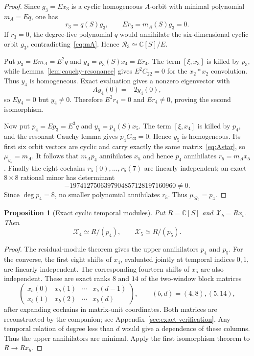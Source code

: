 \documentclass[11pt]{amsart}
\newtheorem{proposition}[theorem]{Proposition}
\newcommand{\C}{\mathbb C}
\begin{document}
\begin{proof}
Since $g_3=Ex_3$ is a cyclic homogeneous $A$-orbit with minimal polynomial $m_A=Eq$, one has
\[
r_3=q(S)g_3,
\qquad
Er_3=m_A(S)g_3=0.
\]
If $r_3=0$, the degree-five polynomial $q$ would annihilate the six-dimensional cyclic orbit $g_3$, contradicting~\eqref{eq:mA}.  Hence $\mathcal R_3\simeq\C[S]/E$.

Put $p_3=Em_A=E^2q$ and $y_4=p_3(S)x_4=Er_4$.  The term $[\xi,x_3]$ is killed by $p_3$, while Lemma~\ref{lem:cauchy-resonance} gives $E^2C_{22}=0$ for the $x_2*x_2$ convolution.  Thus $y_4$ is homogeneous.  Exact evaluation gives a nonzero eigenvector with
\[
Ay_4(0)=-2y_4(0),
\]
so $Ey_4=0$ but $y_4\neq0$.  Therefore $E^2r_4=0$ and $Er_4\neq0$, proving the second isomorphism.

Now put $p_4=Ep_3=E^3q$ and $y_5=p_4(S)x_5$.  The term $[\xi,x_4]$ is killed by $p_4$, and the resonant Cauchy lemma gives $p_4C_{23}=0$.  Hence $y_5$ is homogeneous.  Its first six orbit vectors are cyclic and carry exactly the same matrix~\eqref{eq:Astar}, so $\mu_{y_5}=m_A$.  It follows that $m_Ap_4$ annihilates $x_5$ and hence $p_4$ annihilates $r_5=m_Ax_5$.  Finally the eight cochains $r_5(0),\ldots,r_5(7)$ are linearly independent; an exact $8\times8$ rational minor has determinant
\[
-1974127506397904857128197160960\neq0.
\]
Since $\deg p_4=8$, no smaller polynomial annihilates $r_5$.  Thus $\mu_{\mathcal R_5}=p_4$.
\end{proof}

\begin{proposition}[Exact cyclic temporal modules]\label{prop:temporal-minimal}
Put $R=\C[S]$ and $\mathcal X_b=Rx_b$. Then
\[
\mathcal X_4\simeq R/(p_4),\qquad \mathcal X_5\simeq R/(p_5).
\]
\end{proposition}
\begin{proof}
The residual-module theorem gives the upper annihilators $p_4$ and $p_5$.
For the converse, the first eight shifts of $x_4$, evaluated jointly at
temporal indices $0,1$, are linearly independent. The corresponding fourteen
shifts of $x_5$ are also independent. These are exact ranks $8$ and $14$
of the two-window block matrices
\[
\begin{pmatrix}
x_b(0)&x_b(1)&\cdots&x_b(d-1)\\
x_b(1)&x_b(2)&\cdots&x_b(d)
\end{pmatrix},
\qquad (b,d)=(4,8),(5,14),
\]
after expanding cochains in matrix-unit coordinates. Both matrices are
reconstructed by the companion; see Appendix~\ref{sec:exact-verification}.
Any temporal relation of degree less than $d$ would give a dependence of
these columns. Thus the upper annihilators are minimal. Apply the first
isomorphism theorem to $R\to Rx_b$.
\end{proof}
\end{document}
